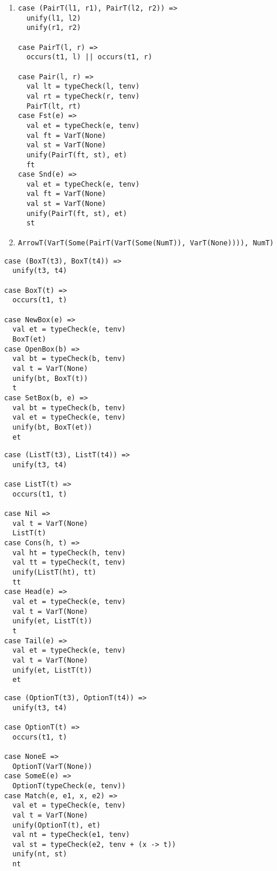 \textbf{}
\begin{enumerate}
  \item
\begin{verbatim}
case (PairT(l1, r1), PairT(l2, r2)) =>
  unify(l1, l2)
  unify(r1, r2)

case PairT(l, r) =>
  occurs(t1, l) || occurs(t1, r)

case Pair(l, r) =>
  val lt = typeCheck(l, tenv)
  val rt = typeCheck(r, tenv)
  PairT(lt, rt)
case Fst(e) =>
  val et = typeCheck(e, tenv)
  val ft = VarT(None)
  val st = VarT(None)
  unify(PairT(ft, st), et)
  ft
case Snd(e) =>
  val et = typeCheck(e, tenv)
  val ft = VarT(None)
  val st = VarT(None)
  unify(PairT(ft, st), et)
  st
\end{verbatim}
  \item
    \verb+ArrowT(VarT(Some(PairT(VarT(Some(NumT)), VarT(None)))), NumT)+
\end{enumerate}

\textbf{}
\vspace{-1em}
\begin{verbatim}
case (BoxT(t3), BoxT(t4)) =>
  unify(t3, t4)

case BoxT(t) =>
  occurs(t1, t)

case NewBox(e) =>
  val et = typeCheck(e, tenv)
  BoxT(et)
case OpenBox(b) =>
  val bt = typeCheck(b, tenv)
  val t = VarT(None)
  unify(bt, BoxT(t))
  t
case SetBox(b, e) =>
  val bt = typeCheck(b, tenv)
  val et = typeCheck(e, tenv)
  unify(bt, BoxT(et))
  et
\end{verbatim}

\textbf{}
\vspace{-1em}
\begin{verbatim}
case (ListT(t3), ListT(t4)) =>
  unify(t3, t4)

case ListT(t) =>
  occurs(t1, t)

case Nil =>
  val t = VarT(None)
  ListT(t)
case Cons(h, t) =>
  val ht = typeCheck(h, tenv)
  val tt = typeCheck(t, tenv)
  unify(ListT(ht), tt)
  tt
case Head(e) =>
  val et = typeCheck(e, tenv)
  val t = VarT(None)
  unify(et, ListT(t))
  t
case Tail(e) =>
  val et = typeCheck(e, tenv)
  val t = VarT(None)
  unify(et, ListT(t))
  et
\end{verbatim}

\textbf{}
\vspace{-1em}
\begin{verbatim}
case (OptionT(t3), OptionT(t4)) =>
  unify(t3, t4)

case OptionT(t) =>
  occurs(t1, t)

case NoneE =>
  OptionT(VarT(None))
case SomeE(e) =>
  OptionT(typeCheck(e, tenv))
case Match(e, e1, x, e2) =>
  val et = typeCheck(e, tenv)
  val t = VarT(None)
  unify(OptionT(t), et)
  val nt = typeCheck(e1, tenv)
  val st = typeCheck(e2, tenv + (x -> t))
  unify(nt, st)
  nt
\end{verbatim}

